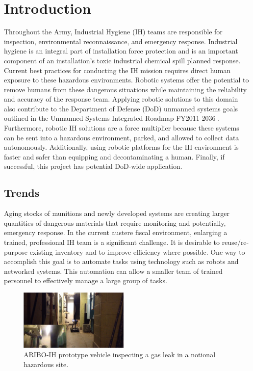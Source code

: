\section{Introduction}\label{sec:introduction}

Throughout the Army, Industrial Hygiene (IH) teams are responsible for inspection, environmental reconnaissance, and emergency response. Industrial hygiene is an integral part of installation force protection and is an important component of an installation’s toxic industrial chemical spill planned response. Current best practices for conducting the IH mission requires direct human exposure to these hazardous environments. Robotic systems offer the potential to remove humans from these dangerous situations while maintaining the reliability and accuracy of the response team. Applying robotic solutions to this domain also contribute to the Department of Defense (DoD) unmanned systems goals outlined in the Unmanned Systems Integrated Roadmap FY2011-2036 \cite{roadmap}. Furthermore, robotic IH solutions are a force multiplier because these systems can be sent into a hazardous environment, parked, and allowed to collect data autonomously. Additionally, using robotic platforms for the IH environment is faster and safer than equipping and decontaminating a human. Finally, if successful, this project has potential DoD-wide application. 

\subsection{Trends}

Aging stocks of munitions and newly developed systems are creating larger quantities of dangerous materials that require monitoring and potentially, emergency response. In the current austere fiscal environment, enlarging a trained, professional IH team is a significant challenge. It is desirable to reuse/re-purpose existing inventory and to improve efficiency where possible.  One way to accomplish this goal is to automate tasks using technology such as robots and networked systems. This automation can allow a smaller team of trained personnel to effectively manage a large group of tasks.

\begin{figure}
	\centering
	\includegraphics[width=0.48\textwidth]{./pictures/concept}
	\caption{ARIBO-IH prototype vehicle inspecting a gas leak in a notional hazardous site.}
	\label{fig:concept}
\end{figure}


